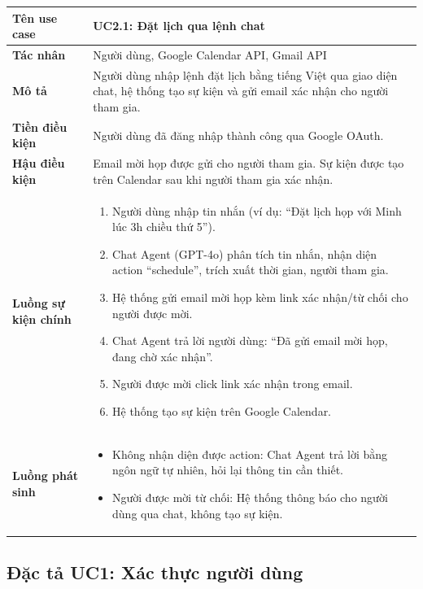 \documentclass[../DoAn.tex]{subfiles}
\begin{document}
\begin{table}[H]
\centering
\small
\begin{tabular}{|p{3.5cm}|p{10cm}|}
\hline
\textbf{Tên use case} & UC2.1: Đặt lịch qua lệnh chat \\
\hline
\textbf{Tác nhân} & Người dùng, Google Calendar API, Gmail API \\
\hline
\textbf{Mô tả} & Người dùng nhập lệnh đặt lịch bằng tiếng Việt qua giao diện chat, hệ thống tạo sự kiện và gửi email xác nhận cho người tham gia. \\
\hline
\textbf{Tiền điều kiện} & Người dùng đã đăng nhập thành công qua Google OAuth. \\
\hline
\textbf{Hậu điều kiện} & Email mời họp được gửi cho người tham gia. Sự kiện được tạo trên Calendar sau khi người tham gia xác nhận. \\
\hline
\textbf{Luồng sự kiện chính} &
\begin{enumerate}
    \item Người dùng nhập tin nhắn (ví dụ: ``Đặt lịch họp với Minh lúc 3h chiều thứ 5'').
    \item Chat Agent (GPT-4o) phân tích tin nhắn, nhận diện action ``schedule'', trích xuất thời gian, người tham gia.
    \item Hệ thống gửi email mời họp kèm link xác nhận/từ chối cho người được mời.
    \item Chat Agent trả lời người dùng: ``Đã gửi email mời họp, đang chờ xác nhận''.
    \item Người được mời click link xác nhận trong email.
    \item Hệ thống tạo sự kiện trên Google Calendar.
\end{enumerate} \\
\hline
\textbf{Luồng phát sinh} &
\begin{itemize}
    \item[2a.] Không nhận diện được action: Chat Agent trả lời bằng ngôn ngữ tự nhiên, hỏi lại thông tin cần thiết.
    \item[5a.] Người được mời từ chối: Hệ thống thông báo cho người dùng qua chat, không tạo sự kiện.
\end{itemize} \\
\hline
\end{tabular}
\end{table}

\subsection{Đặc tả UC1: Xác thực người dùng}
\end{document}
